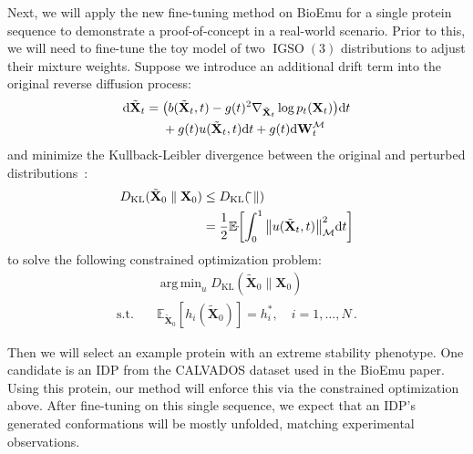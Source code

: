 \documentclass{article}
\theoremstyle{plain}
\theoremstyle{definition}
\theoremstyle{remark}
\DeclareMathOperator{\IGSO}{IGSO}
\DeclareMathOperator*{\argmin}{arg\,min}
\let\P\relax
\DeclareMathOperator{\P}{\mathbb{P}}
\begin{document}
Next, we will apply the new fine-tuning method on BioEmu for a single protein sequence to demonstrate a proof-of-concept in a real-world scenario. Prior to this, we will need to fine-tune the toy model of two $\IGSO(3)$ distributions to adjust their mixture weights. Suppose we introduce an additional drift term into the original reverse diffusion process:
\begin{equation}
    \begin{aligned}
        \dd\tilde{\mathbf{X}}_t ={} &
        \qty(b(\tilde{\mathbf{X}}_t, t)
        - g(t)^2\nabla_{\tilde{\mathbf{X}}_t}\log p_t(\mathbf{X}_t))\dd t   \\
                                    & + g(t)u(\tilde{\mathbf{X}}_t, t)\dd t
        + g(t)\dd \mathbf{W}_t^\mathcal{M}
    \end{aligned}
\end{equation}
and minimize the Kullback-Leibler divergence between the original and perturbed distributions~\cite{sde_on_manifolds_hsu}:
\begin{equation}
    \begin{aligned}
        D_\text{KL}(\tilde{\mathbf{X}}_0\parallel \mathbf{X}_0) & \leq D_\text{KL}(\tilde{\P}\parallel \P)                                                                  \\
                                                                & = \frac{1}{2}\mathbb{E}_{\tilde{\P}} \qty[\int_0^1 \norm{u(\tilde{\mathbf{X}}_t, t)}_\mathcal{M}^2 \dd t]
    \end{aligned}
\end{equation}
to solve the following constrained optimization problem:
\begin{equation}
    \begin{aligned}
         & \argmin_{u} D_\text{KL}(\tilde{\mathbf{X}}_0\parallel \mathbf{X}_0)   \\
        \text{s.t.} \quad
         & \mathbb{E}_{\tilde{\mathbf{X}}_0}[h_i(\tilde{\mathbf{X}}_0)] = h_i^*,
        \quad i = 1,\dots,N\,.
    \end{aligned}
\end{equation}

Then we will select an example protein with an extreme stability phenotype. One candidate is an IDP from the CALVADOS dataset used in the BioEmu paper. Using this protein, our method will enforce this via the constrained optimization above. After fine-tuning on this single sequence, we expect that an IDP's generated conformations will be mostly unfolded, matching experimental observations.
\end{document}
